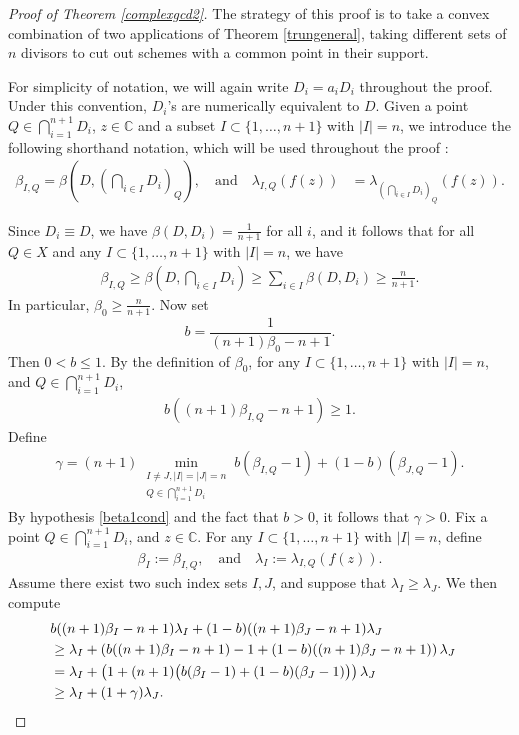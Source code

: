 \documentclass[10pt,a4paper]{amsart}
\begin{document}
 \begin{proof}[Proof of Theorem \ref{complexgcd2}]
The strategy of this proof is to take a convex combination of two applications of Theorem \ref{trungeneral}, taking different sets of $n$ divisors to cut  out schemes with a common point in their support.

For simplicity of notation, we will again write $D_i=a_iD_i$ throughout the proof.    Under this convention, $D_i$'s are numerically equivalent to $D$. Given a point  $Q\in \bigcap_{i=1}^{n+1}D_i $, $z\in\mathbb C$ and  a subset $I \subset \{1,\ldots,n+1\}$ with $|I|=n$,  we introduce the following shorthand notation, which will be used throughout the proof
:\begin{align}\label{shortnotation}
\beta_{I,Q}=\beta(D,(\bigcap_{i \in I} D_i)_{Q}),\quad\text{and}\quad
\lambda_{I,Q}(f(z))&=\lambda_{(\bigcap_{i \in I} D_i)_{Q}}(f(z)). 
\end{align}


Since $D_i\equiv D$, we have $\beta(D,D_i)=\frac{1}{n+1}$ for all $i$, and it follows that for all $Q\in X$ and any $I \subset \{1,\ldots,n+1\}$ with $|I|=n$, we have
\begin{align*}
\beta_{I,Q}\geq \beta(D,\bigcap_{i \in I}D_{i})\geq \sum_{i \in I}\beta(D,D_i)\geq \frac{n}{n+1}.
\end{align*}
In particular, $\beta_0\geq \frac{n}{n+1}$.
Now set 
$$
b = \frac{1}{(n+1)\beta_0-n+1}.
$$ Then $0<b\leq 1$.   By the definition of $\beta_0$, for any $I \subset \{1,\ldots,n+1\}$ with $|I|=n$, and $Q\in  \bigcap_{i=1}^{n+1} D_{i}  $, 
\begin{align}\label{bbeta}
b ( (n+1)\beta_{I,Q}  -n+1 ) \geq 1. 
\end{align}
Define
\begin{align*}
\gamma=(n+1)\min_{\substack{I\neq J,|I|=|J|=n\\Q\in  \bigcap_{i=1}^{n+1} D_{i}  }} b(\beta_{I,Q}-1)+(1-b)(\beta_{J,Q} -1).
\end{align*}
By hypothesis \eqref{beta1cond} and the fact that $b>0$, it follows that $\gamma>0$.  Fix a point $Q\in \bigcap_{i=1}^{n+1}D_i $, and $z\in\mathbb C$.  For any $I \subset \{1,\ldots,n+1\}$ with $|I|=n$, define
\begin{align*}
\beta_{I} :=\beta_{I,Q}, \quad\text{and}\quad
\lambda_{I} :=\lambda_{I,Q}(f(z)). 
\end{align*}
Assume there exist two such index sets  $I,J$, and suppose that $\lambda_{I}\geq \lambda_{J}$.  We then compute
\begin{align}\label{gammabeta}
&b((n+1)\beta_{I}-n+1)\lambda_{I}+(1-b)((n+1)\beta_{J}-n+1)\lambda_{J}\cr
&\geq \lambda_{I}+\left(b((n+1)\beta_{I}-n+1)-1+(1-b)((n+1)\beta_{J}-n+1) \right)\lambda_{J}\cr
&= \lambda_{I}+\left(1+  (n+1)\big(b(\beta_{I}-1)+(1-b)(\beta_{J}-1)  \big) \right) \lambda_{J}\cr
&\geq \lambda_{I}+(1+\gamma)\lambda_{J}.
\end{align}


\end{proof}
\end{document}
